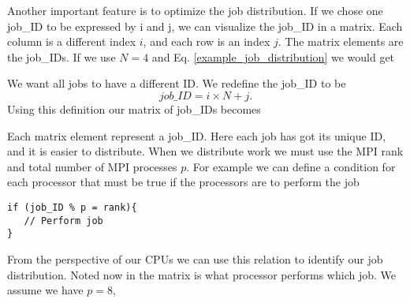 \documentclass[a4paper,norsk,11pt,twoside]{report}
\begin{document}
Another important feature is to optimize the job distribution. If we
chose one job\_ID to be expressed by i and j, we can visualize the
job\_ID in a matrix. Each column is a different index $i$, and each row
is an index $j$. The matrix elements are the job\_IDs. If we use $N = 4$
and Eq. \eqref{example_job_distribution} we would get
\begin{center}
\end{center}
We want all jobs to have a different ID. We redefine the job\_ID to be
\begin{equation}
job\_ID = i \times N + j .
\end{equation}
Using this definition our matrix of job\_IDs becomes
\begin{center}
\end{center}
Each matrix element represent a job\_ID. Here each job has got its
unique ID, and it is easier to distribute. When we distribute work we
must use the MPI rank and total number of MPI processes $p$. For example we
can define a condition for each processor that must be true if the
processors are to perform the job
\begin{lstlisting}
if (job_ID % p = rank){
   // Perform job
}
\end{lstlisting}
From the perspective of our CPUs we can use this relation to identify
our job distribution. Noted now in the matrix is what processor
performs which job. We assume we have $p = 8$, 
\begin{center}
\end{center}
\end{document}

